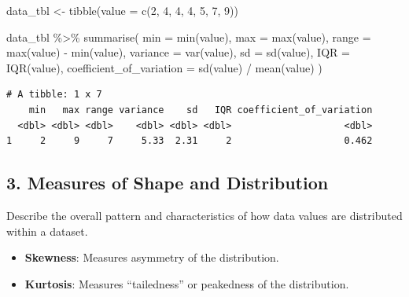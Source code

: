 \documentclass[
  man,
  floatsintext,
  longtable,
  nolmodern,
  notxfonts,
  notimes,
  colorlinks=true,linkcolor=blue,citecolor=blue,urlcolor=blue]{apa7}
\newenvironment{Shaded}{\begin{snugshade}}{\end{snugshade}}
\newcommand{\AttributeTok}[1]{\textcolor[rgb]{0.40,0.45,0.13}{#1}}
\newcommand{\DecValTok}[1]{\textcolor[rgb]{0.68,0.00,0.00}{#1}}
\newcommand{\FunctionTok}[1]{\textcolor[rgb]{0.28,0.35,0.67}{#1}}
\newcommand{\NormalTok}[1]{\textcolor[rgb]{0.00,0.23,0.31}{#1}}
\newcommand{\OtherTok}[1]{\textcolor[rgb]{0.00,0.23,0.31}{#1}}
\newcommand{\SpecialCharTok}[1]{\textcolor[rgb]{0.37,0.37,0.37}{#1}}
\providecommand{\tightlist}{%
  \setlength{\itemsep}{0pt}\setlength{\parskip}{0pt}}
\begin{document}
\begin{Shaded}
\begin{Highlighting}[]
\NormalTok{data\_tbl }\OtherTok{\textless{}{-}} \FunctionTok{tibble}\NormalTok{(}\AttributeTok{value =} \FunctionTok{c}\NormalTok{(}\DecValTok{2}\NormalTok{, }\DecValTok{4}\NormalTok{, }\DecValTok{4}\NormalTok{, }\DecValTok{4}\NormalTok{, }\DecValTok{5}\NormalTok{, }\DecValTok{7}\NormalTok{, }\DecValTok{9}\NormalTok{))}

\NormalTok{data\_tbl }\SpecialCharTok{\%\textgreater{}\%}
  \FunctionTok{summarise}\NormalTok{(}
    \AttributeTok{min =} \FunctionTok{min}\NormalTok{(value),}
    \AttributeTok{max =} \FunctionTok{max}\NormalTok{(value),}
    \AttributeTok{range =} \FunctionTok{max}\NormalTok{(value) }\SpecialCharTok{{-}} \FunctionTok{min}\NormalTok{(value),}
    \AttributeTok{variance =} \FunctionTok{var}\NormalTok{(value),}
    \AttributeTok{sd =} \FunctionTok{sd}\NormalTok{(value),}
    \AttributeTok{IQR =} \FunctionTok{IQR}\NormalTok{(value),}
    \AttributeTok{coefficient\_of\_variation =} \FunctionTok{sd}\NormalTok{(value) }\SpecialCharTok{/} \FunctionTok{mean}\NormalTok{(value)}
\NormalTok{  )}
\end{Highlighting}
\end{Shaded}

\begin{verbatim}
# A tibble: 1 x 7
    min   max range variance    sd   IQR coefficient_of_variation
  <dbl> <dbl> <dbl>    <dbl> <dbl> <dbl>                    <dbl>
1     2     9     7     5.33  2.31     2                    0.462
\end{verbatim}

\subsection{3. Measures of Shape and
Distribution}\label{measures-of-shape-and-distribution}

Describe the overall pattern and characteristics of how data values are
distributed within a dataset.

\begin{itemize}
\tightlist
\item
  \textbf{Skewness}: Measures asymmetry of the distribution.
\item
  \textbf{Kurtosis}: Measures ``tailedness'' or peakedness of the
  distribution.
\end{itemize}
\end{document}
